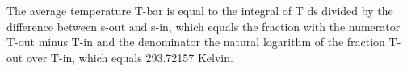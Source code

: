 The average temperature T-bar is equal to the integral of T ds divided by the difference between s-out and s-in, which equals the fraction with the numerator T-out minus T-in and the denominator the natural logarithm of the fraction T-out over T-in, which equals 293.72157 Kelvin.